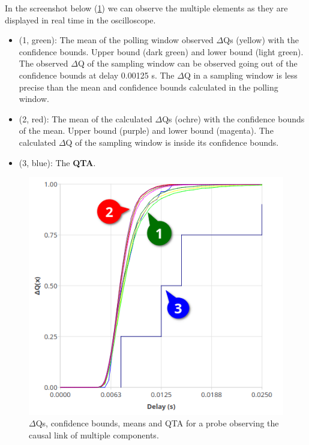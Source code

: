     In the screenshot below (\cref{fig:dq_displ}) we can observe the multiple elements as they are displayed in real time in the oscilloscope.
    \begin{itemize}
        \item (1, green): The mean of the polling window observed $\Delta$Qs (yellow) with the confidence bounds. Upper bound (dark green) and lower bound (light green). The observed $\Delta$Q of the sampling window can be observed going out of the confidence bounds at delay 0.00125 s. The $\Delta$Q in a sampling window is less precise than the mean and confidence bounds calculated in the polling window.
        \item (2, red): The mean of the calculated $\Delta$Qs (ochre) with the confidence bounds of the mean. Upper bound (purple) and lower bound (magenta). The calculated $\Delta$Q of the sampling window is inside its confidence bounds.
        \item (3, blue): The \textbf{QTA}.
    \end{itemize}
     \begin{figure}[H]
        \begin{center}
            \includegraphics[scale = 0.7]{img/overload_2/fired_sampleb.png}
        \end{center}
         \caption{$\Delta$Qs, confidence bounds, means and QTA for a probe observing the causal link of multiple components.}
         \label{fig:dq_displ}
    \end{figure}
        

